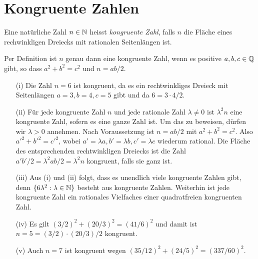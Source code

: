 \chapter{Kongruente Zahlen}

\begin{definition}
  Eine natürliche Zahl $n\in{\mathbb{N}}$ heisst \emph{kongruente
    Zahl}, falls
  $n$ die Fläche eines rechwinkligen Dreiecks mit rationalen
  Seitenlängen ist. 
\end{definition}

\begin{bemerkung}
  Per Definition ist $n$ genau dann eine kongruente Zahl, wenn es positive
  $a,b,c\in{\mathbb{Q}}$ gibt, so dass $a^2+b^2=c^2$ und $n = ab/2$. 
\end{bemerkung}

\begin{beispiele}\leavevmode
  \begin{enumerate}
  \item [(i)]
    Die Zahl $n=6$ ist kongruent, da es ein rechtwinkliges Dreieck mit Seitenlängen
    $a=3,b=4,c=5$  gibt und da $6=3\cdot 4/2$. 
  \item[(ii)]
    Für jede kongruente Zahl $n$ und jede rationale Zahl
    $\lambda\not=0$ ist $\lambda^2 n$ eine kongruente Zahl, sofern es
    eine ganze Zahl ist. Um das zu
    beweisen, dürfen wir $\lambda > 0$ annehmen. Nach Voraussetzung
    ist $n=ab/2$ mit $a^2+b^2=c^2$. Also ${a'}^2+{b'}^2={c'}^2$, wobei
    $a'=\lambda a, b'=\lambda b, c'=\lambda c$ wiederum rational.
    Die Fläche des entsprechenden rechtwinkligen Dreiecks ist die
    Zahl $a'b'/2
    = \lambda^2 ab/2 = \lambda^2 n$ kongruent, falls sie ganz ist.
  \item[(iii)]
    Aus (i) und (ii) folgt, dass es unendlich viele kongruente Zahlen
    gibt, denn $\{6\lambda^2 : \lambda\in{\mathbb{N}}\}$ besteht aus kongruente
    Zahlen.
    Weiterhin ist jede kongruente Zahl ein rationales Vielfaches
    einer quadratfreien kongruenten Zahl.

  \item[(iv)] Es gilt $(3/2)^2 +(20/3)^2 = (41/6)^2$  und damit ist
    $n=5= (3/2)\cdot(20/3)/2$ kongruent.
    
  \item[(v)] Auch $n=7$ ist kongruent wegen $(35/12)^2 +
    (24/5)^2=(337/60)^2$.

  \end{enumerate}  
\end{beispiele}

